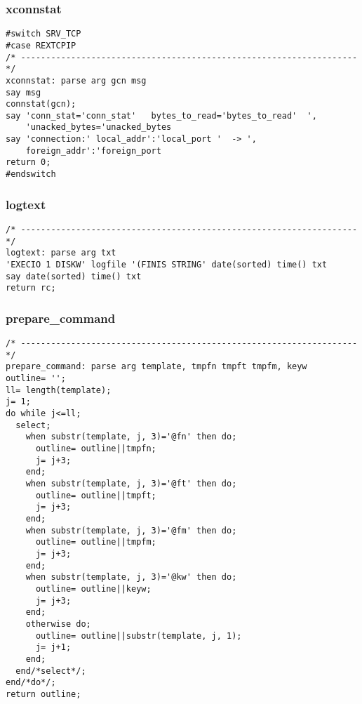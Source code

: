 \subsubsection{xconnstat}

\def\LPtopF{xconnstat}

\begin{verbatim}
#switch SRV_TCP
#case REXTCPIP 
/* ------------------------------------------------------------------- */
xconnstat: parse arg gcn msg
say msg
connstat(gcn);
say 'conn_stat='conn_stat'   bytes_to_read='bytes_to_read'  ',
    'unacked_bytes='unacked_bytes
say 'connection:' local_addr':'local_port '  -> ',
    foreign_addr':'foreign_port
return 0;
#endswitch
\end{verbatim}

\subsubsection{logtext}

\def\LPtopF{logtext}

\begin{verbatim}
/* ------------------------------------------------------------------- */
logtext: parse arg txt
'EXECIO 1 DISKW' logfile '(FINIS STRING' date(sorted) time() txt
say date(sorted) time() txt
return rc;
\end{verbatim}

\subsubsection{prepare\_command}

\def\LPtopF{prepare\_command}

\begin{verbatim}
/* ------------------------------------------------------------------- */
prepare_command: parse arg template, tmpfn tmpft tmpfm, keyw
outline= '';
ll= length(template);
j= 1;
do while j<=ll;
  select;
    when substr(template, j, 3)='@fn' then do;
      outline= outline||tmpfn;
      j= j+3;
    end;
    when substr(template, j, 3)='@ft' then do;
      outline= outline||tmpft;
      j= j+3;
    end;
    when substr(template, j, 3)='@fm' then do;
      outline= outline||tmpfm;
      j= j+3;
    end;
    when substr(template, j, 3)='@kw' then do;
      outline= outline||keyw;
      j= j+3;
    end;
    otherwise do;
      outline= outline||substr(template, j, 1);
      j= j+1;
    end;
  end/*select*/;
end/*do*/;
return outline;
\end{verbatim}

